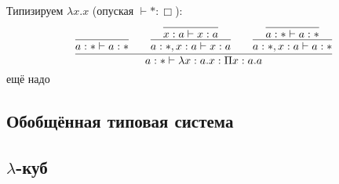 \begin{example} Типизируем $\lambda x . x$ (опуская $\vdash * : \Box$):
\[
    \infer{a : * \vdash \lambda x : a . x : \Pi x : a . a}
        { \infer{a : * \vdash a : *}{}
        &&\infer{a : *, x : a \vdash x : a}{\infer{x : a \vdash x : a}{}}
        &&\infer{a : *, x : a \vdash a : *}{\infer{a : * \vdash a : *}{}}
        }
\]
\todo ещё надо
\end{example}

\subsection{\texorpdfstring{Обобщённая типовая система}{Generalized type system}}

\subsection{\texorpdfstring{$\lambda$-куб}{Lambda cube}}
